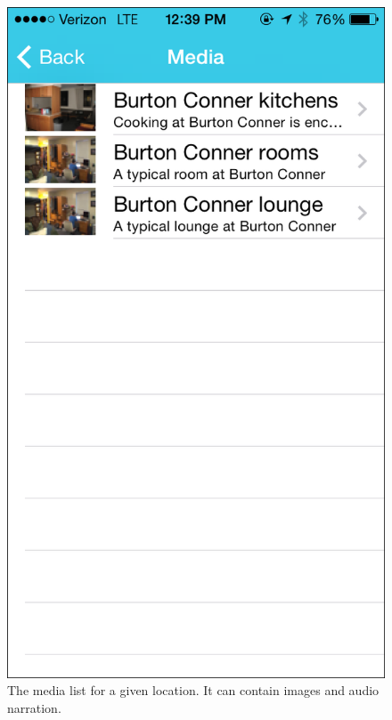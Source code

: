 \documentclass{sigchi}
\begin{document}
\begin{figure}
\centering
\includegraphics[width=0.7\linewidth]{./MediaList}
\caption{The media list for a given location. It can contain images and audio narration.}
\label{fig:MediaList}
\end{figure}
\end{document}
